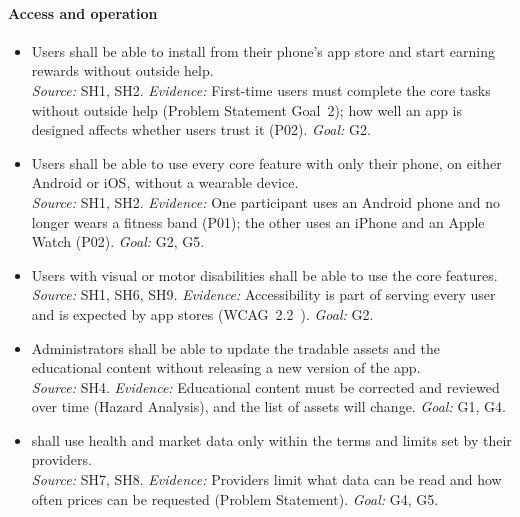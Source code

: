\documentclass[12pt]{article}
\newcounter{srnum} %
\begin{document}
\paragraph{Access and operation}

{\sloppy
  \noindent\begin{itemize}
    \item[SR\refstepcounter{srnum}\thesrnum\label{SR_EasyStart}:] Users shall be able to install \progname{} from their phone's app store and start earning rewards without outside help.\\
          \emph{Source:} SH1, SH2. \emph{Evidence:} First-time users must complete the core tasks without outside help (Problem Statement Goal~2); how well an app is designed affects whether users trust it (P02). \emph{Goal:} G2.
    \item[SR\refstepcounter{srnum}\thesrnum\label{SR_PhoneOnly}:] Users shall be able to use every core feature with only their phone, on either Android or iOS, without a wearable device.\\
          \emph{Source:} SH1, SH2. \emph{Evidence:} One participant uses an Android phone and no longer wears a fitness band (P01); the other uses an iPhone and an Apple Watch (P02). \emph{Goal:} G2, G5.
    \item[SR\refstepcounter{srnum}\thesrnum\label{SR_Accessible}:] Users with visual or motor disabilities shall be able to use the core features.\\
          \emph{Source:} SH1, SH6, SH9. \emph{Evidence:} Accessibility is part of serving every user and is expected by app stores (WCAG~2.2~\citep{WCAG22}). \emph{Goal:} G2.
    \item[SR\refstepcounter{srnum}\thesrnum\label{SR_UpdateContent}:] Administrators shall be able to update the tradable assets and the educational content without releasing a new version of the app.\\
          \emph{Source:} SH4. \emph{Evidence:} Educational content must be corrected and reviewed over time (Hazard Analysis), and the list of assets will change. \emph{Goal:} G1, G4.
    \item[SR\refstepcounter{srnum}\thesrnum\label{SR_RespectProviders}:] \progname{} shall use health and market data only within the terms and limits set by their providers.\\
          \emph{Source:} SH7, SH8. \emph{Evidence:} Providers limit what data can be read and how often prices can be requested (Problem Statement). \emph{Goal:} G4, G5.
  \end{itemize}
  \par}
\end{document}
